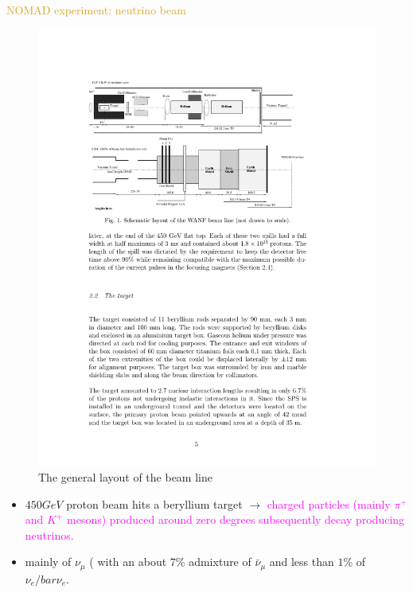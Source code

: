 \documentclass[11pt]{beamer} %
\renewcommand{\(}{\begin{columns}}
\renewcommand{\)}{\end{columns}}
\newcommand{\<}[1]{\begin{column}{#1}}
\renewcommand{\>}{\end{column}}
\newcommand{\itt}{\begin{itemize}}
\newcommand{\tti}{\end{itemize}}
\begin{document}
\begin{frame}{\textcolor{Goldenrod}{NOMAD experiment: neutrino beam}}
  \begin{overlayarea}{\textwidth}{\textheight}
  \begin{figure}[h]
    \centering
    \includegraphics[height=0.35\textheight, width=0.7\linewidth]{./Images/NOMAD03}
    \caption*{The general layout of the beam line}
  \end{figure}
  \itt[<only@+>]
\item $450 GeV$ proton beam hits a beryllium target $\to$
  \textcolor{Magenta}{charged particles (mainly $\pi^+$ and $K^+$
    mesons) produced around zero degrees subsequently decay producing
    neutrinos.}
  
  
\item mainly of $\nu_{\mu}$ (
  with an about $7$\% admixture of $\bar{\nu}_{\mu}$ and less than
  $1$\% of $\nu_e/bar{\nu}_e$.
  \tti
 \end{overlayarea} 
\end{frame}
\end{document}
